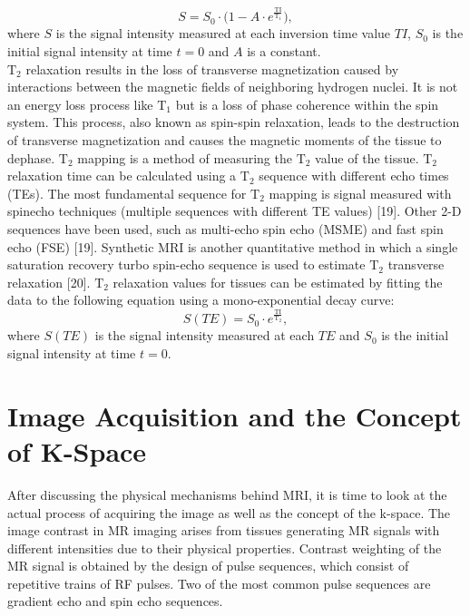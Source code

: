 \documentclass[english,version-2022-01]{uzl-thesis} %
\begin{document}
\begin{equation}
	S = S_0 \cdot \bigg(1 - A \cdot e^{\frac{\text{TI}}{\text{T}_1}} \bigg),
\end{equation}
where $S$ is the signal intensity measured at each inversion time value $TI$, $S_0$ is the initial signal intensity at time $t=0$ and $A$ is
a constant.\\
$\text{T}_2$ relaxation results in the loss of transverse magnetization caused by interactions between the magnetic fields of neighboring hydrogen nuclei. It is not an energy loss process like $\text{T}_1$ but is a loss of phase coherence within the spin system. This process, also known as spin-spin relaxation, leads to the destruction of transverse magnetization and causes the magnetic moments of the tissue to dephase. $\text{T}_2$ mapping is a method of measuring the $\text{T}_2$ value of the tissue. $\text{T}_2$ relaxation time can be calculated using a $\text{T}_2$ sequence with different echo times (TEs). The most fundamental sequence for $\text{T}_2$ mapping is signal measured with spinecho techniques (multiple sequences with different TE values) [19]. Other 2-D sequences have been used, such as multi-echo spin echo (MSME) and fast spin echo (FSE) [19]. Synthetic MRI is another quantitative method in which a single saturation recovery turbo spin-echo sequence is used to estimate $\text{T}_2$ transverse relaxation [20]. $\text{T}_2$ relaxation values for tissues can be estimated by fitting the data to the following equation using a mono-exponential decay curve:
\begin{equation}
	S(TE) = S_0 \cdot e^{\frac{\text{TI}}{\text{T}_2}},
\end{equation}
where $S(TE)$ is the signal intensity measured at each $TE$ and
$S_0$ is the initial signal intensity at time $t=0$.

\section{Image Acquisition and the Concept of K-Space} \label{Sec:ImageAcquisitionAndK-Space}
After discussing the physical mechanisms behind MRI, it is time to look at the actual process of acquiring the image as well as the concept of the k-space. 
The image contrast in MR imaging arises from tissues generating MR signals with different intensities due to their physical properties. Contrast weighting of the MR signal is obtained by the design of pulse sequences, which consist of repetitive trains of RF pulses. Two of the most common pulse sequences are gradient echo 
and spin echo 
sequences. %
\end{document}
